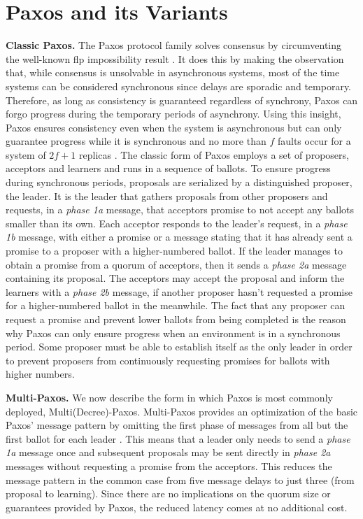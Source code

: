 \section{Paxos and its Variants} \label{Paxos} 
\textbf{Classic Paxos.} The Paxos protocol family solves consensus by circumventing the well-known \acrshort{flp} impossibility result \cite{Fischer1985}. It does this by making the observation that, while consensus is unsolvable in asynchronous systems, most of the time systems can be considered synchronous since delays are sporadic and temporary. Therefore, as long as consistency is guaranteed regardless of synchrony, Paxos can forgo progress during the temporary periods of asynchrony. Using this insight, Paxos ensures consistency even when the system is asynchronous but can only guarantee progress while it is synchronous and no more than $f$ faults occur for a system of $2f+1$ replicas \cite{Lamport2001}. The classic form of Paxos employs a set of proposers, acceptors and learners and runs in a sequence of ballots. To ensure progress during synchronous periods, proposals are serialized by a distinguished proposer, the leader. It is the leader that gathers proposals from other proposers and requests, in a \textit{phase 1a} message, that acceptors promise to not accept any ballots smaller than its own. Each acceptor responds to the leader's request, in a \textit{phase 1b} message, with either a promise or a message stating that it has already sent a promise to a proposer with a higher-numbered ballot. If the leader manages to obtain a promise from a quorum of acceptors, then it sends a \textit{phase 2a} message containing its proposal. The acceptors may accept the proposal and inform the learners with a \textit{phase 2b} message, if another proposer hasn't requested a promise for a higher-numbered ballot in the meanwhile. The fact that any proposer can request a promise and prevent lower ballots from being completed is the reason why Paxos can only ensure progress when an environment is in a synchronous period. Some proposer must be able to establish itself as the only leader in order to prevent proposers from continuously requesting promises for ballots with higher numbers. \par
\textbf{Multi-Paxos.} We now describe the form in which Paxos is most commonly deployed, Multi(Decree)-Paxos. Multi-Paxos provides an optimization of the basic Paxos' message pattern by omitting the first phase of messages from all but the first ballot for each leader \cite{Renesse2011}. This means that a leader only needs to send a \textit{phase 1a} message once and subsequent proposals may be sent directly in \textit{phase 2a} messages without requesting a promise from the acceptors. This reduces the message pattern in the common case from five message delays to just three (from proposal to learning). Since there are no implications on the quorum size or guarantees provided by Paxos, the reduced latency comes at no additional cost. \par
